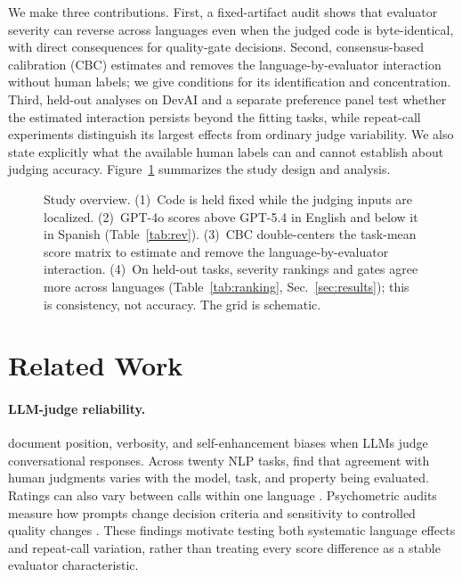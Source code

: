 \documentclass[sigconf,anonymous]{aamas}
\begin{document}
We make three contributions. First, a fixed-artifact audit shows that
evaluator severity can reverse across languages even when the judged code
is byte-identical, with direct consequences for quality-gate decisions.
Second, consensus-based calibration (CBC) estimates and removes the
language-by-evaluator interaction without human labels; we give conditions
for its identification and concentration. Third, held-out analyses on DevAI and a
separate preference panel test whether the estimated interaction persists
beyond the fitting tasks, while repeat-call experiments distinguish its
largest effects from ordinary judge variability. We also state explicitly
what the available human labels can and cannot establish about judging
accuracy. Figure~\ref{fig:overview} summarizes the study design and analysis.

\begin{figure}[t]
\centering

\caption{Study overview. (1)~Code is held fixed while the judging inputs
are localized. (2)~GPT-4o scores above GPT-5.4 in English and below it in
Spanish (Table~\ref{tab:rev}). (3)~CBC double-centers the task-mean score matrix to
estimate and remove the language-by-evaluator interaction. (4)~On held-out
tasks, severity rankings and gates agree more across languages
(Table~\ref{tab:ranking}, Sec.~\ref{sec:results}); this is consistency,
not accuracy. The grid is schematic.}
\label{fig:overview}
\end{figure}

\section{Related Work}
\label{sec:related}

\paragraph{LLM-judge reliability.}
\citet{zheng2023judging} document position, verbosity, and self-enhancement
biases when LLMs judge conversational responses. Across twenty NLP tasks,
\citet{bavaresco2025llms} find that agreement with human judgments varies
with the model, task, and property being evaluated. Ratings can also vary
between calls within one language \citep{stureborg2024inconsistent}.
Psychometric audits measure how prompts change decision criteria and
sensitivity to controlled quality changes \citep{usami2026darkcurrent}.
These findings motivate testing both systematic language effects and
repeat-call variation, rather than treating every score difference as a
stable evaluator characteristic.
\end{document}

